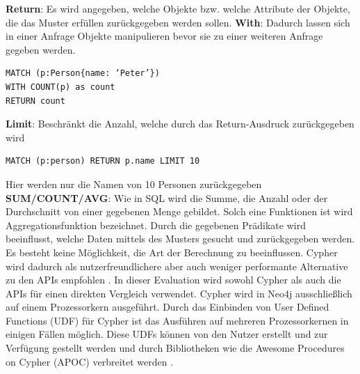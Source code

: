 \textbf{Return}: Es wird angegeben, welche Objekte bzw. welche Attribute der Objekte, die das Muster erfüllen zurückgegeben werden sollen.\newline
\textbf{With}: Dadurch lassen sich in einer Anfrage Objekte manipulieren bevor sie zu einer weiteren Anfrage gegeben werden. 
\begin{Verbatim}[frame=single]
MATCH (p:Person{name: ‘Peter’})  
WITH COUNT(p) as count  
RETURN count
\end{Verbatim} 
\textbf{Limit}: Beschränkt die Anzahl, welche durch das Return-Ausdruck zurückgegeben wird 
\begin{Verbatim}[frame=single]
MATCH (p:person) RETURN p.name LIMIT 10
\end{Verbatim}
Hier werden nur die Namen  von 10 Personen zurückgegeben\newline
\textbf{SUM/COUNT/AVG}: Wie in SQL wird die Summe, die Anzahl oder der Durchschnitt von einer gegebenen Menge gebildet. Solch eine Funktionen ist wird Aggregationsfunktion bezeichnet. \newline 
Durch die gegebenen Prädikate wird beeinflusst, welche Daten mittels des Musters gesucht und zurückgegeben werden. Es besteht keine Möglichkeit, die Art der Berechnung zu beeinflussen. Cypher wird dadurch als nutzerfreundlichere aber auch weniger performante Alternative zu den APIs empfohlen \parencite{vukotic2015neo4j}. In dieser Evaluation wird sowohl Cypher als auch die APIs für einen direkten Vergleich verwendet. Cypher wird in Neo4j ausschließlich auf einem Prozessorkern ausgeführt. Durch das Einbinden von User Defined Functions (UDF) für Cypher ist das Ausführen auf mehreren Prozessorkernen in einigen Fällen möglich. Diese UDFs können von den Nutzer erstellt und zur Verfügung gestellt werden und  durch Bibliotheken wie die Awesome Procedures on Cypher (APOC) verbreitet werden \parencite{APOC}.

